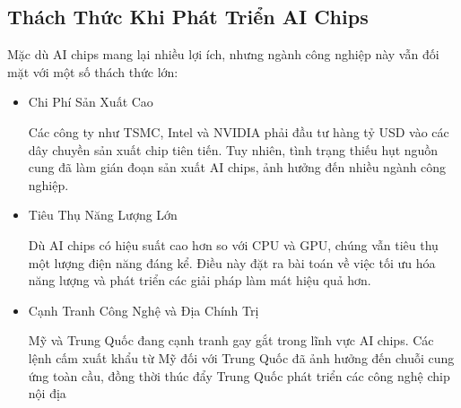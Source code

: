 \documentclass[a4paper]{article}
\begin{document}
\subsection{Thách Thức Khi Phát Triển AI Chips}
Mặc dù AI chips mang lại nhiều lợi ích, nhưng ngành công nghiệp này vẫn đối mặt với một số thách thức lớn:
\begin{itemize}
    \item Chi Phí Sản Xuất Cao\par
    Các công ty như TSMC, Intel và NVIDIA phải đầu tư hàng tỷ USD vào các dây chuyền sản xuất chip tiên tiến. Tuy nhiên, tình trạng thiếu hụt nguồn cung đã làm gián đoạn sản xuất AI chips, ảnh hưởng đến nhiều ngành công nghiệp.
    \item Tiêu Thụ Năng Lượng Lớn\par
    Dù AI chips có hiệu suất cao hơn so với CPU và GPU, chúng vẫn tiêu thụ một lượng điện năng đáng kể. Điều này đặt ra bài toán về việc tối ưu hóa năng lượng và phát triển các giải pháp làm mát hiệu quả hơn.
    \item Cạnh Tranh Công Nghệ và Địa Chính Trị\par
    Mỹ và Trung Quốc đang cạnh tranh gay gắt trong lĩnh vực AI chips. Các lệnh cấm xuất khẩu từ Mỹ đối với Trung Quốc đã ảnh hưởng đến chuỗi cung ứng toàn cầu, đồng thời thúc đẩy Trung Quốc phát triển các công nghệ chip nội địa
\end{itemize}
\end{document}

